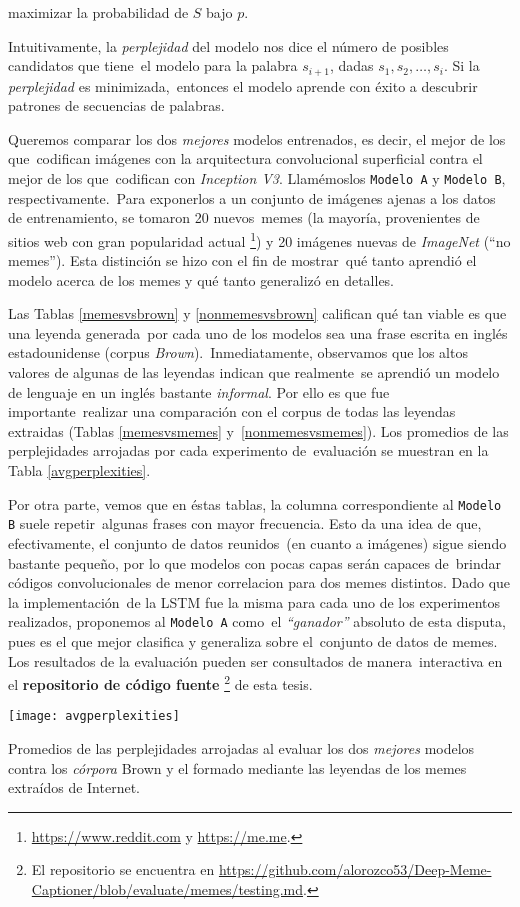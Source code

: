 maximizar la probabilidad de $S$ bajo $p$.\par
Intuitivamente, la \emph{perplejidad} del modelo nos dice el número de posibles candidatos que tiene\
el modelo para la palabra $s_{i+1}$, dadas $s_1, s_2, \ldots, s_i$. Si la \emph{perplejidad} es minimizada,\
entonces el modelo aprende con éxito a descubrir patrones de secuencias de palabras.\par
Queremos comparar los dos \emph{mejores} modelos entrenados, es decir, el mejor de los que\
codifican imágenes con la arquitectura convolucional superficial contra el mejor de los que\
codifican con \emph{Inception V3}. Llamémoslos \verb+Modelo A+ y \verb+Modelo B+, respectivamente.\
Para exponerlos a un conjunto de imágenes ajenas a los datos de entrenamiento, se tomaron 20 nuevos\
memes (la mayoría, provenientes de sitios web con gran popularidad actual%
\footnote{
  \url{https://www.reddit.com} y \url{https://me.me}.
}) y 20 imágenes nuevas de \emph{ImageNet} (``no memes''). Esta distinción se hizo con el fin de mostrar\
qué tanto aprendió el modelo acerca de los memes y qué tanto generalizó en detalles.\par
Las Tablas \ref{memesvsbrown} y \ref{nonmemesvsbrown} califican qué tan viable es que una leyenda generada\
por cada uno de los modelos sea una frase escrita en inglés estadounidense (corpus \emph{Brown}).\
Inmediatamente, observamos que los altos valores de algunas de las leyendas indican que realmente\
se aprendió un modelo de lenguaje en un inglés bastante \emph{informal}. Por ello es que fue importante\
realizar una comparación con el corpus de todas las leyendas extraidas (Tablas \ref{memesvsmemes} y\
\ref{nonmemesvsmemes}). Los promedios de las perplejidades arrojadas por cada experimento de\
evaluación se muestran en la Tabla \ref{avgperplexities}.\par
Por otra parte, vemos que en éstas tablas, la columna correspondiente al \verb+Modelo B+ suele repetir\
algunas frases con mayor frecuencia. Esto da una idea de que, efectivamente, el conjunto de datos reunidos\
(en cuanto a imágenes) sigue siendo bastante pequeño, por lo que modelos con pocas capas serán capaces de\
brindar códigos convolucionales de menor correlacion para dos memes distintos. Dado que la implementación\
de la LSTM fue la misma para cada uno de los experimentos realizados, proponemos al \verb+Modelo A+ como\
el \emph{``ganador''} absoluto de esta disputa, pues es el que mejor clasifica y generaliza sobre el\
conjunto de datos de memes. Los resultados de la evaluación pueden ser consultados de manera\
interactiva en el \textbf{repositorio de código fuente}%
\footnote{
  El repositorio se encuentra en \url{https://github.com/alorozco53/Deep-Meme-Captioner/blob/evaluate/memes/testing.md}.
} de esta tesis.

\begin{table}[H]
  \centering
  \texttt{[image: avgperplexities]}
  \caption{
    Promedios de las perplejidades arrojadas al evaluar los dos \emph{mejores} modelos contra los
    \emph{córpora} Brown y el formado mediante las leyendas de los memes extraídos de Internet.
  }
  \label{avgperplexities}
\end{table}
